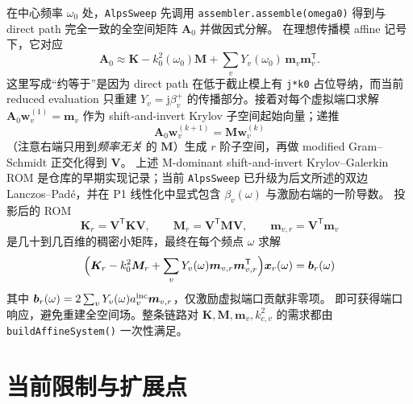 \documentclass[UTF8,a4paper,11pt]{ctexart}
\newcommand{\jj}{\mathrm{j}}
\newcommand{\transpose}{\mathsf{T}}
\newcommand{\code}[1]{\texttt{\small #1}}
\begin{document}
在中心频率 $\omega_0$ 处，\code{AlpsSweep} 先调用 \code{assembler.assemble(omega0)} 得到与 direct path 完全一致的全空间矩阵 $\bm A_0$ 并做因式分解。
在理想传播模 affine 记号下，它对应
\begin{equation}
    \bm A_0\approx\bm K-k_0^{2}(\omega_0)\bm M
    +\sum_vY_v(\omega_0)\,\bm m_v\bm m_v^{\transpose}.
\end{equation}
这里写成“约等于”是因为 direct path 在低于截止模上有 \code{j*k0} 占位导纳，而当前 reduced evaluation 只重建 $Y_v=\jj\beta_v^+$ 的传播部分。接着对每个虚拟端口求解 $\bm A_0\bm w_v^{(1)}=\bm m_v$ 作为 shift-and-invert Krylov 子空间起始向量；递推
\begin{equation}
    \bm A_0\bm w_v^{(k+1)}=\bm M\bm w_v^{(k)}
\end{equation}
（注意右端只用到\emph{频率无关} 的 $\bm M$）生成 $r$ 阶子空间，再做 modified Gram--Schmidt 正交化得到 $\bm V$。
上述 M-dominant shift-and-invert Krylov--Galerkin ROM 是仓库的早期实现记录；当前 \code{AlpsSweep} 已升级为后文所述的双边 Lanczos--Padé，并在 P1 线性化中显式包含 $\beta_v(\omega)$ 与激励右端的一阶导数。
投影后的 ROM
\begin{equation}
    \bm K_r=\bm V^{\transpose}\bm K\bm V,\qquad
    \bm M_r=\bm V^{\transpose}\bm M\bm V,\qquad
    \bm m_{v,r}=\bm V^{\transpose}\bm m_v
\end{equation}
是几十到几百维的稠密小矩阵，最终在每个频点 $\omega$ 求解
\begin{equation}
    \Bigl(\bm K_r-k_0^{2}\bm M_r+\sum_vY_v(\omega)\bm m_{v,r}\bm m_{v,r}^{\transpose}\Bigr)
    \bm x_r(\omega)=\bm b_r(\omega)
\end{equation}
其中 $\bm b_r(\omega)=2\sum_vY_v(\omega)a_v^{\rm inc}\bm m_{v,r}$，仅激励虚拟端口贡献非零项。
即可获得端口响应，避免重建全空间场。整条链路对 $\bm K,\bm M,\bm m_v,k_{c,v}^{2}$ 的需求都由 \code{buildAffineSystem()} 一次性满足。

\section{当前限制与扩展点}
\label{sec:limits}
\end{document}
